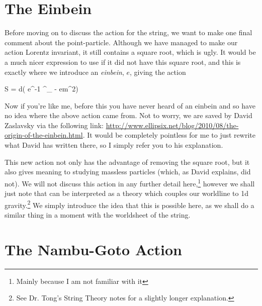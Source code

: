 \section{The Einbein}

Before moving on to discuss the action for the string, we want to make one final comment about the point-particle. Although we have managed to make our action Lorentz invariant, it still contains a square root, which is ugly. It would be a much nicer expression to use if it did not have this square root, and this is exactly where we introduce an \textit{einbein}, $e$, giving the action 

\be 
\label{eqn:PointActionEinbein}
    S = \int d\tau \big( e^{-1} ^{\mu}_{\mu} - em^2\big)
\ee 

Now if you're like me, before this you have never heard of an einbein and so have no idea where the above action came from. Not to worry, we are saved by David Zaslavsky via the following link: \href{http://www.ellipsix.net/blog/2010/08/the-origin-of-the-einbein.html}{http://www.ellipsix.net/blog/2010/08/the-origin-of-the-einbein.html}. It would be completely pointless for me to just rewrite what David has written there, so I simply refer you to his explanation. 

This new action not only has the advantage of removing the square root, but it also gives meaning to studying massless particles (which, as David explains,  did not). We will not discuss this action in any further detail here,\footnote{Mainly because I am not familiar with it} however we shall just note that  can be interpreted as a theory which couples our worldline to 1d gravity.\footnote{See Dr. Tong's String Theory notes for a slightly longer explanation.} We simply introduce the idea that this is possible here, as we shall do a similar thing in a moment with the worldsheet of the string. 

\section{The Nambu-Goto Action}


